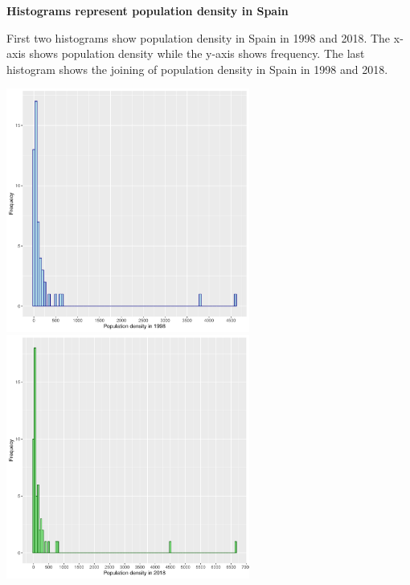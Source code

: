 \documentclass[12pt, oneside]{report}\usepackage[]{graphicx}\usepackage[]{color}
\begin{document}
\begin{center}
\textbf {Histograms represent population density in Spain} \\
\end{center}
First two histograms show population density in Spain in 1998 and 2018. The x-axis shows population density while the y-axis shows frequency. The last histogram shows the joining of population density in Spain in 1998 and 2018.\\

\begin{Schunk}


{\centering \includegraphics[width=8cm,height=8cm]{figure/unnamed-chunk-19-1} \includegraphics[width=8cm,height=8cm]{figure/unnamed-chunk-19-2} 

}

\end{Schunk}
\end{document}
